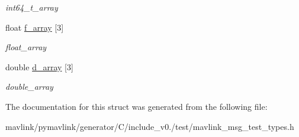\begin{DoxyCompactItemize}
\begin{DoxyCompactList}\small\item\em int64\+\_\+t\+\_\+array \end{DoxyCompactList}\item 
\mbox{\label{struct____mavlink__test__types__t_a68b419edbba3363825518ccf81482f85}} 
float \hyperlink{struct____mavlink__test__types__t_a68b419edbba3363825518ccf81482f85}{f\+\_\+array} \mbox{[}3\mbox{]}
\begin{DoxyCompactList}\small\item\em float\+\_\+array \end{DoxyCompactList}\item 
\mbox{\label{struct____mavlink__test__types__t_a21df24e69478562cbd26e9a954dbb403}} 
double \hyperlink{struct____mavlink__test__types__t_a21df24e69478562cbd26e9a954dbb403}{d\+\_\+array} \mbox{[}3\mbox{]}
\begin{DoxyCompactList}\small\item\em double\+\_\+array \end{DoxyCompactList}\end{DoxyCompactItemize}


The documentation for this struct was generated from the following file\+:\begin{DoxyCompactItemize}
\item 
mavlink/pymavlink/generator/\+C/include\+\_\+v0./test/mavlink\+\_\+msg\+\_\+test\+\_\+types.\+h\end{DoxyCompactItemize}
